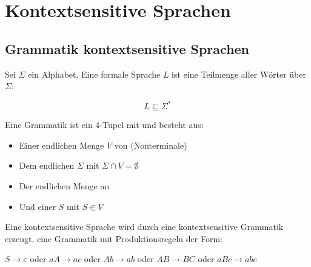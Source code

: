 \documentclass{bschlangaul-haupt}
\begin{document}

\chapter{Kontextsensitive Sprachen}

\begin{liQuellen}
\item \cite[Seite 191-192]{hoffmann}
\end{liQuellen}

%

\section{Grammatik kontextsensitive Sprachen}

Sei $\Sigma$ ein Alphabet. Eine formale Sprache $L$ ist eine Teilmenge
aller Wörter über $\Sigma$:

\begin{displaymath}
L \subseteq \Sigma^*
\end{displaymath}

\bigskip

\noindent
Eine Grammatik ist ein 4-Tupel mit \liGrammatik{} und besteht aus:

\begin{itemize}
\item Einer endlichen Menge $V$ von  (Nonterminale)

\item Dem endlichen  $\Sigma$ mit $\Sigma \cap V
= \emptyset$

\item Der endlichen Menge an 

\item Und einer  $S$ mit $S \in V$
\end{itemize}

Eine kontextsensitive Sprache wird durch eine kontextsensitive
Grammatik erzeugt, \dh eine Grammatik mit Produktionsregeln der
Form:

$S \rightarrow \varepsilon$ oder
$aA \rightarrow ac$ oder
$Ab \rightarrow ab$ oder
$AB \rightarrow BC$ oder
$aBc \rightarrow abc$
\end{document}
